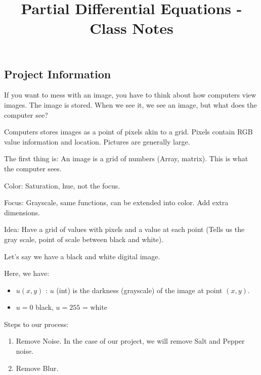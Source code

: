 \documentclass{article}
\title{Partial Differential Equations - Class Notes} %
\begin{document}
\maketitle
\newpage



\subsection*{Project Information}

If you want to mess with an image, you have to think about how computers view images. The image is stored. When we see it, we see an image, but what does the computer see?

Computers stores images as a point of pixels akin to a grid. Pixels contain RGB value information and location. Pictures are generally large.

The first thing is: An image is a grid of numbers (Array, matrix). This is what the computer sees.

Color: Saturation, hue, not the focus.

Focus: Grayscale, same functions, can be extended into color. Add extra dimensions.

Idea: Have a grid of values with pixels and a value at each point (Tells us the gray scale, point of scale between black and white).

\bigbreak


Let's say we have a black and white digital image.


Here, we have:

\begin{itemize}
  \item $u(x, y)$ : $u$ (int) is the darkness (grayscale) of the image at point $(x, y)$.
  \item $u = 0$ black, $u = 255$ = white
\end{itemize}

Steps to our process:
%
\begin{enumerate}
  \item Remove Noise. In the case of our project, we will remove Salt and Pepper noise.
  \item Remove Blur.
\end{enumerate}
\end{document}
